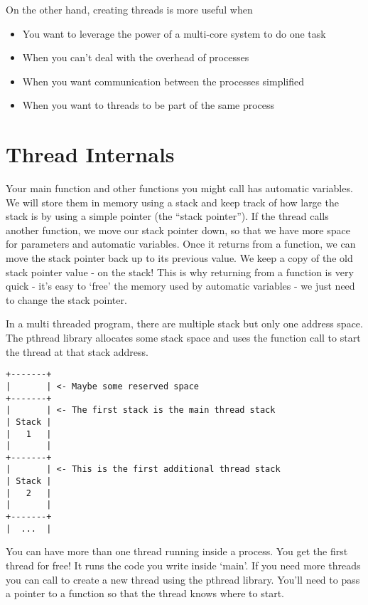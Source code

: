 On the other hand, creating threads is more useful when
\begin{itemize}
\item You want to leverage the power of a multi-core system to do one task
\item When you can't deal with the overhead of processes
\item When you want communication between the processes simplified
\item When you want to threads to be part of the same process
\end{itemize}

\section{Thread Internals}

Your main function and other functions you might call has automatic variables.
We will store them in memory using a stack and keep track of how large the stack is by using a simple pointer (the ``stack pointer'').
If the thread calls another function, we move our stack pointer down, so that we have more space for parameters and automatic variables.
Once it returns from a function, we can move the stack pointer back up to its previous value.
We keep a copy of the old stack pointer value - on the stack!
This is why returning from a function is very quick - it's easy to `free' the memory used by automatic variables - we just need to change the stack pointer.

In a multi threaded program, there are multiple stack but only one address space. The pthread library allocates some stack space and uses the  function call to start the thread at that stack address.

\begin{verbatim}
+-------+
|       | <- Maybe some reserved space
+-------+
|       | <- The first stack is the main thread stack
| Stack |
|   1   |
|       |
+-------+
|       | <- This is the first additional thread stack
| Stack |
|   2   |
|       |
+-------+
|  ...  |
\end{verbatim}

You can have more than one thread running inside a process.
You get the first thread for free! It runs the code you write inside `main'.
If you need more threads you can call  to create a new thread using the pthread library. You'll need to pass a pointer to a function so that the thread knows where to start.

